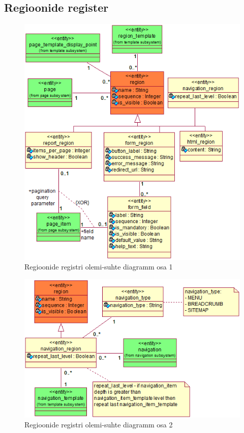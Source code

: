\documentclass[a4paper,12pt]{article} %
\begin{document}
\subsection*{Regioonide register}
\begin{figure}[H]
\centering
\includegraphics[width=\textwidth]{./diagrams/region-er-diagram.png}
\caption{Regioonide registri olemi-suhte diagramm osa 1}
\label{fig_regioonide_registri_olemi_suhte_diagramm}
\end{figure}

\begin{figure}[H]
\centering
\includegraphics[width=\textwidth]{./diagrams/navigation-region-er-diagram.png}
\caption{Regioonide registri olemi-suhte diagramm osa 2}
\label{fig_navigatsiooni_regioonide_registri_olemi_suhte_diagramm}
\end{figure}
\end{document}
